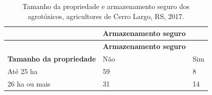 \documentclass[12pt,portuguese,oneside]{book}
\begin{document}
\begin{longtable}[]{@{}lll@{}}
\caption{\label{tab:tamprop}Tamanho da propriedade e armazenamento seguro
dos agrotóxicos, agricultores de Cerro Largo, RS, 2017.}\tabularnewline
\toprule
\begin{minipage}[b]{0.35\columnwidth}\raggedright\strut
\strut
\end{minipage} & \begin{minipage}[b]{0.32\columnwidth}\raggedright\strut
\textbf{Armazenamento seguro}\strut
\end{minipage} & \begin{minipage}[b]{0.15\columnwidth}\raggedright\strut
\strut
\end{minipage}\tabularnewline
\midrule
\endfirsthead
\toprule
\begin{minipage}[b]{0.35\columnwidth}\raggedright\strut
\strut
\end{minipage} & \begin{minipage}[b]{0.32\columnwidth}\raggedright\strut
\textbf{Armazenamento seguro}\strut
\end{minipage} & \begin{minipage}[b]{0.15\columnwidth}\raggedright\strut
\strut
\end{minipage}\tabularnewline
\midrule
\endhead
\begin{minipage}[t]{0.35\columnwidth}\raggedright\strut
\textbf{Tamanho da propriedade}\strut
\end{minipage} & \begin{minipage}[t]{0.32\columnwidth}\raggedright\strut
Não\strut
\end{minipage} & \begin{minipage}[t]{0.15\columnwidth}\raggedright\strut
Sim\strut
\end{minipage}\tabularnewline
\begin{minipage}[t]{0.35\columnwidth}\raggedright\strut
Até 25 ha\strut
\end{minipage} & \begin{minipage}[t]{0.32\columnwidth}\raggedright\strut
59\strut
\end{minipage} & \begin{minipage}[t]{0.15\columnwidth}\raggedright\strut
8\strut
\end{minipage}\tabularnewline
\begin{minipage}[t]{0.35\columnwidth}\raggedright\strut
26 ha ou mais\strut
\end{minipage} & \begin{minipage}[t]{0.32\columnwidth}\raggedright\strut
31\strut
\end{minipage} & \begin{minipage}[t]{0.15\columnwidth}\raggedright\strut
14\strut
\end{minipage}\tabularnewline
\bottomrule
\end{longtable}
\end{document}
